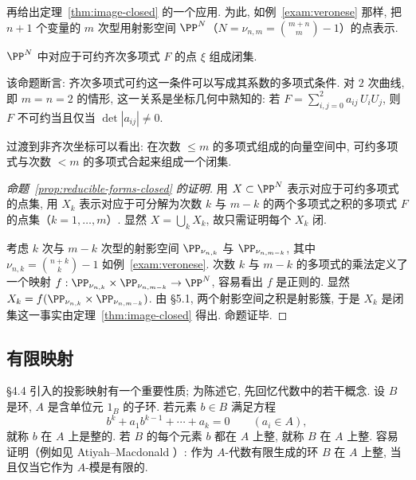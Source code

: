 再给出定理~\ref{thm:image-closed} 的一个应用. 为此, 如例~\ref{exam:veronese} 那样, 把 $n+1$ 个变量的 $m$ 次型用射影空间 $\PP^N$（$N = \nu_{n,m} = \binom{m+n}{m} - 1$）的点表示.

\begin{proposition}\label{prop:reducible-forms-closed}
	$\PP^N$ 中对应于可约齐次多项式 $F$ 的点 $\xi$ 组成闭集.
\end{proposition}

\begin{remark}\label{rem:reducible-coefficients}
	该命题断言: 齐次多项式可约这一条件可以写成其系数的多项式条件. 对 $2$ 次曲线, 即 $m = n = 2$ 的情形, 这一关系是坐标几何中熟知的: 若 $F = \sum_{i,j=0}^{2} a_{ij}\, U_i U_j$, 则 $F$ 不可约当且仅当 $\det |a_{ij}| \ne 0$.
\end{remark}

\begin{remark}\label{rem:reducible-inhomogeneous}
	过渡到非齐次坐标可以看出: 在次数 $\le m$ 的多项式组成的向量空间中, 可约多项式与次数 $< m$ 的多项式合起来组成一个闭集.
\end{remark}

\begin{proof}[命题~\ref{prop:reducible-forms-closed} 的证明]
	用 $X \subset \PP^N$ 表示对应于可约多项式的点集, 用 $X_k$ 表示对应于可分解为次数 $k$ 与 $m-k$ 的两个多项式之积的多项式 $F$ 的点集（$k = 1, \ldots, m$）. 显然 $X = \bigcup_k X_k$, 故只需证明每个 $X_k$ 闭.

	考虑 $k$ 次与 $m-k$ 次型的射影空间 $\PP_{\nu_{n,k}}$ 与 $\PP_{\nu_{n,m-k}}$, 其中 $\nu_{n,k} = \binom{n+k}{k} - 1$ 如例~\ref{exam:veronese}. 次数 $k$ 与 $m-k$ 的多项式的乘法定义了一个映射 $f: \PP_{\nu_{n,k}} \times \PP_{\nu_{n,m-k}} \to \PP^N$, 容易看出 $f$ 是正则的. 显然 $X_k = f(\PP_{\nu_{n,k}} \times \PP_{\nu_{n,m-k}})$. 由 §5.1, 两个射影空间之积是射影簇, 于是 $X_k$ 是闭集这一事实由定理~\ref{thm:image-closed} 得出. 命题证毕.
\end{proof}

\subsection{有限映射}

§4.4 引入的投影映射有一个重要性质; 为陈述它, 先回忆代数中的若干概念. 设 $B$ 是环, $A$ 是含单位元 $1_B$ 的子环. 若元素 $b \in B$ 满足方程
\[
	b^k + a_1 b^{k-1} + \cdots + a_k = 0 \qquad (a_i \in A),
\]
就称 $b$ 在 $A$ 上是整的. 若 $B$ 的每个元素 $b$ 都在 $A$ 上整, 就称 $B$ 在 $A$ 上整. 容易证明（例如见 Atiyah--Macdonald \cite[第 5 章命题 5.1 与推论 5.2]{atiyah-macdonald1969}）: 作为 $A$-代数有限生成的环 $B$ 在 $A$ 上整, 当且仅当它作为 $A$-模是有限的.

